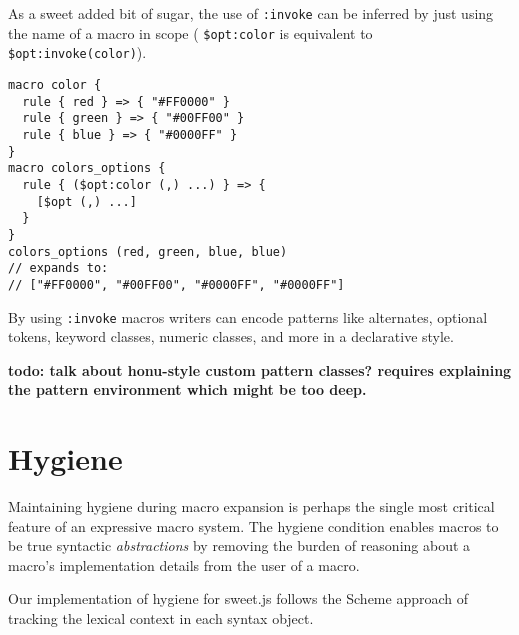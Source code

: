 \documentclass[preprint,10pt]{sigplanconf}
\begin{document}
As a sweet added bit of sugar, the use of \lstinline!:invoke! can be
inferred by just using the name of a macro in scope (\ie
\lstinline!$opt:color! is equivalent to
\lstinline!$opt:invoke(color)!).

\begin{lstlisting}
macro color {
  rule { red } => { "#FF0000" }
  rule { green } => { "#00FF00" }
  rule { blue } => { "#0000FF" }
}
macro colors_options {
  rule { ($opt:color (,) ...) } => { 
    [$opt (,) ...]
  }
}
colors_options (red, green, blue, blue)
// expands to:
// ["#FF0000", "#00FF00", "#0000FF", "#0000FF"]
\end{lstlisting}

By using \lstinline!:invoke! macros writers can encode patterns
like alternates, optional tokens, keyword classes, numeric classes,
and more in a declarative style.

\textbf{todo: talk about honu-style custom pattern classes? requires
  explaining the pattern environment which might be too deep.}





\section{Hygiene}
\label{sec:hygiene}

Maintaining hygiene during macro expansion is perhaps the single most
critical feature of an expressive macro system. The hygiene condition
enables macros to be true syntactic \emph{abstractions} by removing
the burden of reasoning about a macro's implementation details from the
user of a macro.

Our implementation of hygiene for sweet.js follows the Scheme approach
\cite{Hieb1992,Flatt2012} of tracking the lexical context in each
syntax object.
\end{document}

